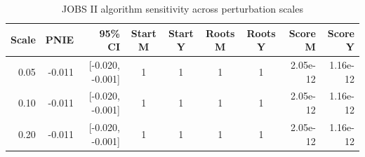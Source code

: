 \begin{table}[htbp]
\centering
\caption{JOBS II algorithm sensitivity across perturbation scales}
\label{tab:application_sensitivity}
\scriptsize
\begin{tabular}{rrrccccrr}
\toprule
Scale & PNIE & 95\% CI & Start M & Start Y & Roots M & Roots Y & Score M & Score Y \\
\midrule
0.05 & -0.011 & [-0.020, -0.001] & 1 & 1 & 1 & 1 & 2.05e-12 & 1.16e-12 \\
0.10 & -0.011 & [-0.020, -0.001] & 1 & 1 & 1 & 1 & 2.05e-12 & 1.16e-12 \\
0.20 & -0.011 & [-0.020, -0.001] & 1 & 1 & 1 & 1 & 2.05e-12 & 1.16e-12 \\
\bottomrule
\end{tabular}
\end{table}
